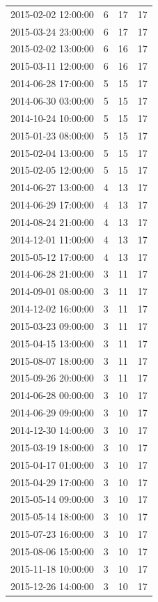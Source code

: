 \begin{tabular}{lrrr}
2015-02-02 12:00:00 & 6 & 17 & 17 \\
2015-03-24 23:00:00 & 6 & 17 & 17 \\
2015-02-02 13:00:00 & 6 & 16 & 17 \\
2015-03-11 12:00:00 & 6 & 16 & 17 \\
2014-06-28 17:00:00 & 5 & 15 & 17 \\
2014-06-30 03:00:00 & 5 & 15 & 17 \\
2014-10-24 10:00:00 & 5 & 15 & 17 \\
2015-01-23 08:00:00 & 5 & 15 & 17 \\
2015-02-04 13:00:00 & 5 & 15 & 17 \\
2015-02-05 12:00:00 & 5 & 15 & 17 \\
2014-06-27 13:00:00 & 4 & 13 & 17 \\
2014-06-29 17:00:00 & 4 & 13 & 17 \\
2014-08-24 21:00:00 & 4 & 13 & 17 \\
2014-12-01 11:00:00 & 4 & 13 & 17 \\
2015-05-12 17:00:00 & 4 & 13 & 17 \\
2014-06-28 21:00:00 & 3 & 11 & 17 \\
2014-09-01 08:00:00 & 3 & 11 & 17 \\
2014-12-02 16:00:00 & 3 & 11 & 17 \\
2015-03-23 09:00:00 & 3 & 11 & 17 \\
2015-04-15 13:00:00 & 3 & 11 & 17 \\
2015-08-07 18:00:00 & 3 & 11 & 17 \\
2015-09-26 20:00:00 & 3 & 11 & 17 \\
2014-06-28 00:00:00 & 3 & 10 & 17 \\
2014-06-29 09:00:00 & 3 & 10 & 17 \\
2014-12-30 14:00:00 & 3 & 10 & 17 \\
2015-03-19 18:00:00 & 3 & 10 & 17 \\
2015-04-17 01:00:00 & 3 & 10 & 17 \\
2015-04-29 17:00:00 & 3 & 10 & 17 \\
2015-05-14 09:00:00 & 3 & 10 & 17 \\
2015-05-14 18:00:00 & 3 & 10 & 17 \\
2015-07-23 16:00:00 & 3 & 10 & 17 \\
2015-08-06 15:00:00 & 3 & 10 & 17 \\
2015-11-18 10:00:00 & 3 & 10 & 17 \\
2015-12-26 14:00:00 & 3 & 10 & 17 \\

\end{tabular}
